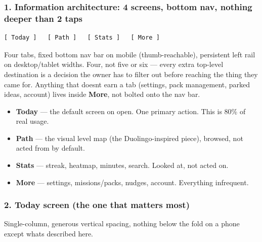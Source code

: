 \hypertarget{ui-ux-spec-1-information-architecture-4-screens-bottom-nav-nothing-deeper-than-2-taps}{%
\subsubsection{1. Information architecture: 4 screens, bottom nav,
nothing deeper than 2
taps}\label{ui-ux-spec-1-information-architecture-4-screens-bottom-nav-nothing-deeper-than-2-taps}}

\begin{verbatim}
[ Today ]   [ Path ]   [ Stats ]   [ More ]
\end{verbatim}

Four tabs, fixed bottom nav bar on mobile (thumb-reachable), persistent
left rail on desktop/tablet widths. Four, not five or six --- every
extra top-level destination is a decision the owner has to filter out
before reaching the thing they came for. Anything that
doesn\textquotesingle t earn a tab (settings, pack management, parked
ideas, account) lives inside \textbf{More}, not bolted onto the nav bar.

\begin{itemize}
\tightlist
\item
  \textbf{Today} --- the default screen on open. One primary action.
  This is 80\% of real usage.
\item
  \textbf{Path} --- the visual level map (the Duolingo-inspired piece),
  browsed, not acted from by default.
\item
  \textbf{Stats} --- streak, heatmap, minutes, search. Looked at, not
  acted on.
\item
  \textbf{More} --- settings, missions/packs, nudges, account.
  Everything infrequent.
\end{itemize}

\hypertarget{ui-ux-spec-2-today-screen-the-one-that-matters-most}{%
\subsubsection{2. Today screen (the one that matters
most)}\label{ui-ux-spec-2-today-screen-the-one-that-matters-most}}

Single-column, generous vertical spacing, nothing below the fold on a
phone except what\textquotesingle s described here.

